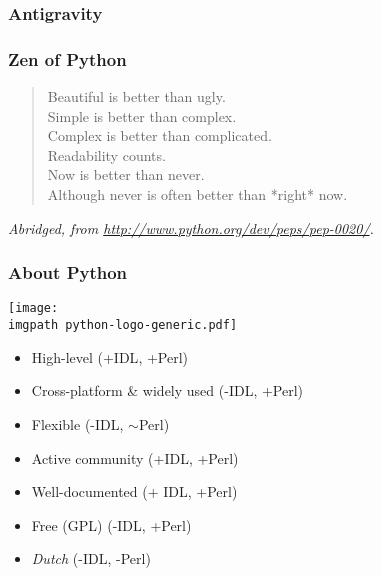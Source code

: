 \documentclass[xetex,10pt]{beamer}
\def\imgpath{../00-img/}
\def\green{\color{green}}
\def\orange{\color{orange}}
\def\red{\color{red}}
\def\spacer{\vspace*{1em}}
\begin{document}
\begin{frame}
	\frametitle{Antigravity}
	\begin{center}
	\vfill
	\vfill
	\end{center}
\end{frame}

\begin{frame}
	\frametitle{Zen of Python}
	\begin{quote}
	Beautiful is better than ugly.\\
	\pause
	Simple is better than complex.\\
	Complex is better than complicated.\\
	\pause
	Readability counts.\\
	\pause
    Now is better than never.\\
    Although never is often better than *right* now.\\
\end{quote}

\spacer

\emph{Abridged, from \url{http://www.python.org/dev/peps/pep-0020/}.}
\end{frame}

\begin{frame}
	\frametitle{About Python}
	\texttt{[image: \\imgpath python-logo-generic.pdf]}
	
	\begin{itemize}
		\item High-level ({\green +IDL}, {\green +Perl})
		\item Cross-platform \& widely used ({\red -IDL}, {\green +Perl})
		\item Flexible ({\red -IDL}, {\orange $\sim$Perl})
		\item Active community ({\green +IDL}, {\green +Perl})
		\item Well-documented ({\green + IDL}, {\green +Perl})
		\item Free (GPL) ({\red -IDL}, {\green +Perl})
		\item \emph{Dutch} ({\red -IDL}, {\red -Perl})
	\end{itemize}
	
\end{frame}
\end{document}
